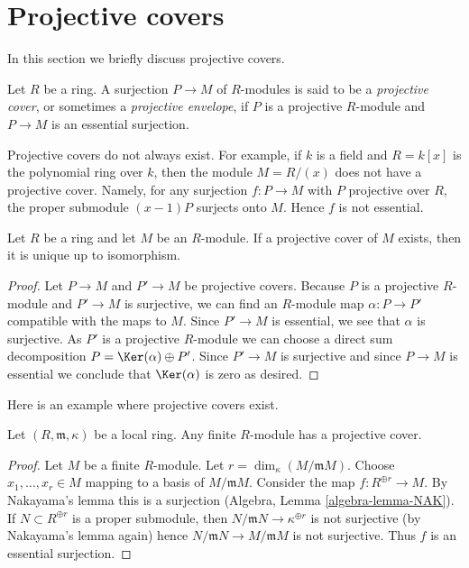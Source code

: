 \section{Projective covers}
\label{section-projective-cover}

\noindent
In this section we briefly discuss projective covers.

\begin{definition}
\label{definition-projective-cover}
Let $R$ be a ring. A surjection $P \to M$ of $R$-modules is said
to be a {\it projective cover}, or sometimes a {\it projective envelope},
if $P$ is a projective $R$-module and $P \to M$ is an essential
surjection.
\end{definition}

\noindent
Projective covers do not always exist. For example, if $k$ is a field
and $R = k[x]$ is the polynomial ring over $k$, then the module $M = R/(x)$
does not have a projective cover. Namely, for any surjection $f : P \to M$
with $P$ projective over $R$, the proper submodule $(x - 1)P$ surjects
onto $M$. Hence $f$ is not essential.

\begin{lemma}
\label{lemma-projective-cover-unique}
Let $R$ be a ring and let $M$ be an $R$-module. If a projective cover
of $M$ exists, then it is unique up to isomorphism.
\end{lemma}

\begin{proof}
Let $P \to M$ and $P' \to M$ be projective covers. Because $P$ is a
projective $R$-module and $P' \to M$ is surjective, we can find an
$R$-module map $\alpha : P \to P'$ compatible with the maps to $M$.
Since $P' \to M$ is essential, we see that $\alpha$ is surjective.
As $P'$ is a projective $R$-module we can choose a direct sum decomposition
$P = \Ker(\alpha) \oplus P'$. Since $P' \to M$ is surjective
and since $P \to M$ is essential we conclude that $\Ker(\alpha)$
is zero as desired.
\end{proof}

\noindent
Here is an example where projective covers exist.

\begin{lemma}
\label{lemma-projective-covers-local}
Let $(R, \mathfrak m, \kappa)$ be a local ring. Any finite $R$-module has
a projective cover.
\end{lemma}

\begin{proof}
Let $M$ be a finite $R$-module. Let $r = \dim_\kappa(M/\mathfrak m M)$.
Choose $x_1, \ldots, x_r \in M$ mapping to a basis of $M/\mathfrak m M$.
Consider the map $f : R^{\oplus r} \to M$. By Nakayama's lemma this is
a surjection (Algebra, Lemma \ref{algebra-lemma-NAK}). If
$N \subset R^{\oplus r}$ is a proper submodule, then
$N/\mathfrak m N \to \kappa^{\oplus r}$ is not surjective (by
Nakayama's lemma again) hence $N/\mathfrak m N \to M/\mathfrak m M$
is not surjective. Thus $f$ is an essential surjection.
\end{proof}







